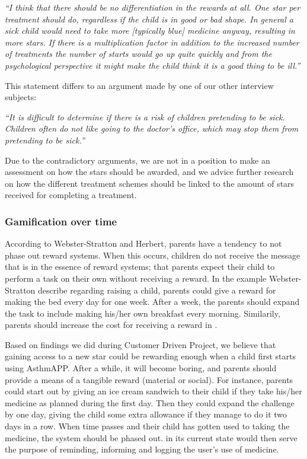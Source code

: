 \emph{``I think that there should be no differentiation in the rewards at all. One star per treatment should do, regardless if the child is in good or bad shape. In general a sick child would need to take more [typically blue] medicine anyway, resulting in more stars. If there is a multiplication factor in addition to the increased number of treatments the number of starts would go up quite quickly and from the psychological perspective it might make the child think it is a good thing to be ill.''}

This statement differs to an argument made by one of our other interview subjects:

\emph{``It is difficult to determine if there is a risk of children pretending to be sick. Children often do not like going to the doctor’s office, which may stop them from pretending to be sick.''}

Due to the contradictory arguments, we are not in a position to make an assessment on how the stars should be awarded, and we advice further research on how the different treatment schemes should be linked to the amount of stars received for completing a treatment. 

\subsubsection{Gamification over time}
\label{sec:gamificationovertime}
According to Webster-Stratton and Herbert, parents have a tendency to not phase out reward systems\cite{webster1994troubled}. When this occurs, children do not receive the message that is in the essence of reward systems; that parents expect their child to perform a task on their own without receiving a reward. In the example Webster-Stratton \etal{} describe regarding raising a child, parents could give a reward for making the bed every day for one week. After a week, the parents should expand the task to include making his/her own breakfast every morning. Similarily, parents should increase the cost for receiving a reward in \app{}.  

Based on findings we did during Customer Driven Project\cite{CustomerDriven}, we believe that gaining access to a new star could be rewarding enough when a child first starts using AsthmAPP. After a while, it will become boring, and parents should provide a means of a tangible reward (material or social). For instance, parents could start out by giving an ice cream sandwich to their child if they take his/her medicine as planned during the first day. Then they could expand the challenge by one day, giving the child some extra allowance if they manage to do it two days in a row. When time passes and their child has gotten used to taking the medicine, the system should be phased out. \app{} in its current state would then serve the purpose of reminding, informing and logging the user's use of medicine.

